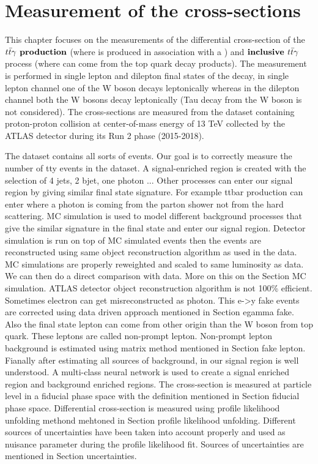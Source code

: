 
\chapter{Measurement of the \tty cross-sections} %

\label{Chapter3} %
This chapter focuses on the measurements of the differential cross-section of
the $\textbf{\tty production}$ (where \ttbar is produced in association with a
\photon) and $\textbf{inclusive $t\bar{t}\gamma$}$ process (where \photon can come from the top
quark decay products). The measurement is performed in single lepton and
dilepton final states of the \ttbar decay, in single lepton channel one
of the W boson decays leptonically whereas in the dilepton channel both the W bosons
decay leptonically (Tau decay from the W boson is not considered). The
cross-sections are measured from the dataset containing proton-proton collision at center-of-mass
energy of 13 TeV collected by the ATLAS detector during its Run 2 phase (2015-2018). 

The dataset contains all sorts of events. Our goal is to correctly measure the number of tty events in the dataset. A signal-enriched region is created with the selection of 4 jets, 2 bjet, one photon ... Other processes can enter our signal region by giving similar final state signature. For example ttbar production can enter where a photon is coming from the parton shower not from the hard scattering.
MC simulation is used to model different background processes that give the similar signature in the final state and enter our signal region. Detector simulation is run on top of MC simulated events then the events are reconstructed using same object reconstruction algorithm as used in the data. MC simulations are properly reweighted and scaled to same luminosity as data. We can then do a direct comparison with data. More on this on the Section {MC simulation}.
ATLAS detector object reconstruction algorithm is not 100\% efficient. Sometimes electron can get misreconstructed as photon. This e->y fake events are corrected using data driven approach mentioned in Section {egamma fake}. Also the final state lepton can come from other origin than the W boson from top quark. These leptons are called non-prompt lepton. Non-prompt lepton background is estimated using matrix method mentioned in Section {fake lepton}.
Fianally after estimating all sources of background, in our signal region is well understood. A multi-class neural network is used to create a signal enriched region and background enriched regions.
The cross-section is measured at particle level in a fiducial phase space with the definition mentioned in Section {fiducial phase space}. Differential cross-section is measured using profile likelihood unfolding methond mehtoned in Section {profile likelihood unfolding}.
Different sources of uncertainties have been taken into account properly and used as nuisance parameter during the profile likelihood fit. Sources of uncertainties are mentioned in Section {uncertainties}.




